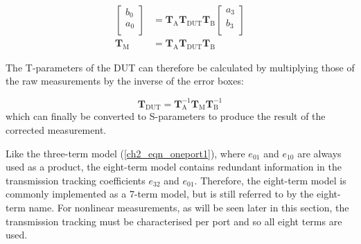 \documentclass[../thesis/thesis.tex]{subfiles}
\begin{document}

\begin{align}
	\begin{bmatrix}
		b_0 \\
		a_0 \\
	\end{bmatrix}
	&=\mathbf{T}_\textrm{A} \mathbf{T}_\textrm{DUT} \mathbf{T}_\textrm{B}
	\begin{bmatrix}
		a_3 \\
		b_3 \\
	\end{bmatrix} \\
	\mathbf{T}_\textrm{M} &= \mathbf{T}_\textrm{A}\mathbf{T}_\textrm{DUT}\mathbf{T}_\textrm{B}
\end{align}

The T-parameters of the DUT can therefore be calculated by multiplying those of the raw measurements by the inverse of the error boxes:

\begin{equation}
	\mathbf{T}_\textrm{DUT} = \mathbf{T}_\textrm{A}^{-1}\mathbf{T}_\textrm{M}\mathbf{T}_\textrm{B}^{-1}
\end{equation}
which can finally be converted to S-parameters to produce the result of the corrected measurement.

Like the three-term model (\ref{ch2_eqn_oneport1}), where $e_{01}$ and $e_{10}$ are always used as a product, the eight-term model contains redundant information in the transmission tracking coefficients $e_{32}$ and $e_{01}$. Therefore, the eight-term model is commonly implemented as a 7-term model, but is still referred to by the eight-term name. For nonlinear measurements, as will be seen later in this section, the transmission tracking must be characterised per port and so all eight terms are used.
\end{document}
